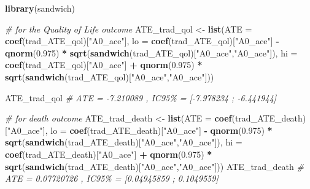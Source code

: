 \documentclass[
]{book}
\newenvironment{Shaded}{\begin{snugshade}}{\end{snugshade}}
\newcommand{\AttributeTok}[1]{\textcolor[rgb]{0.13,0.29,0.53}{#1}}
\newcommand{\CommentTok}[1]{\textcolor[rgb]{0.56,0.35,0.01}{\textit{#1}}}
\newcommand{\FloatTok}[1]{\textcolor[rgb]{0.00,0.00,0.81}{#1}}
\newcommand{\FunctionTok}[1]{\textcolor[rgb]{0.13,0.29,0.53}{\textbf{#1}}}
\newcommand{\NormalTok}[1]{#1}
\newcommand{\OtherTok}[1]{\textcolor[rgb]{0.56,0.35,0.01}{#1}}
\newcommand{\SpecialCharTok}[1]{\textcolor[rgb]{0.81,0.36,0.00}{\textbf{#1}}}
\newcommand{\StringTok}[1]{\textcolor[rgb]{0.31,0.60,0.02}{#1}}
\begin{document}
\begin{Shaded}
\begin{Highlighting}[]
\FunctionTok{library}\NormalTok{(sandwich)}

\CommentTok{\# for the Quality of Life outcome}
\NormalTok{ATE\_trad\_qol }\OtherTok{\textless{}{-}} \FunctionTok{list}\NormalTok{(}\AttributeTok{ATE =} \FunctionTok{coef}\NormalTok{(trad\_ATE\_qol)[}\StringTok{"A0\_ace"}\NormalTok{],}
                     \AttributeTok{lo =} \FunctionTok{coef}\NormalTok{(trad\_ATE\_qol)[}\StringTok{"A0\_ace"}\NormalTok{] }\SpecialCharTok{{-}} \FunctionTok{qnorm}\NormalTok{(}\FloatTok{0.975}\NormalTok{) }\SpecialCharTok{*}
                       \FunctionTok{sqrt}\NormalTok{(}\FunctionTok{sandwich}\NormalTok{(trad\_ATE\_qol)[}\StringTok{"A0\_ace"}\NormalTok{,}\StringTok{"A0\_ace"}\NormalTok{]),}
                     \AttributeTok{hi =} \FunctionTok{coef}\NormalTok{(trad\_ATE\_qol)[}\StringTok{"A0\_ace"}\NormalTok{] }\SpecialCharTok{+} \FunctionTok{qnorm}\NormalTok{(}\FloatTok{0.975}\NormalTok{) }\SpecialCharTok{*}
                       \FunctionTok{sqrt}\NormalTok{(}\FunctionTok{sandwich}\NormalTok{(trad\_ATE\_qol)[}\StringTok{"A0\_ace"}\NormalTok{,}\StringTok{"A0\_ace"}\NormalTok{]))}

\NormalTok{ATE\_trad\_qol}
\CommentTok{\# ATE = {-}7.210089 , IC95\% = [{-}7.978234 ; {-}6.441944]}

\CommentTok{\# for death outcome}
\NormalTok{ATE\_trad\_death }\OtherTok{\textless{}{-}} \FunctionTok{list}\NormalTok{(}\AttributeTok{ATE =} \FunctionTok{coef}\NormalTok{(trad\_ATE\_death)[}\StringTok{"A0\_ace"}\NormalTok{],}
                       \AttributeTok{lo =} \FunctionTok{coef}\NormalTok{(trad\_ATE\_death)[}\StringTok{"A0\_ace"}\NormalTok{] }\SpecialCharTok{{-}} \FunctionTok{qnorm}\NormalTok{(}\FloatTok{0.975}\NormalTok{) }\SpecialCharTok{*}
                         \FunctionTok{sqrt}\NormalTok{(}\FunctionTok{sandwich}\NormalTok{(trad\_ATE\_death)[}\StringTok{"A0\_ace"}\NormalTok{,}\StringTok{"A0\_ace"}\NormalTok{]),}
                       \AttributeTok{hi =} \FunctionTok{coef}\NormalTok{(trad\_ATE\_death)[}\StringTok{"A0\_ace"}\NormalTok{] }\SpecialCharTok{+} \FunctionTok{qnorm}\NormalTok{(}\FloatTok{0.975}\NormalTok{) }\SpecialCharTok{*}
                         \FunctionTok{sqrt}\NormalTok{(}\FunctionTok{sandwich}\NormalTok{(trad\_ATE\_death)[}\StringTok{"A0\_ace"}\NormalTok{,}\StringTok{"A0\_ace"}\NormalTok{]))}
\NormalTok{ATE\_trad\_death}
\CommentTok{\# ATE = 0.07720726 , IC95\% = [0.04945859 ; 0.1049559]}


\end{Highlighting}
\end{Shaded}
\end{document}
